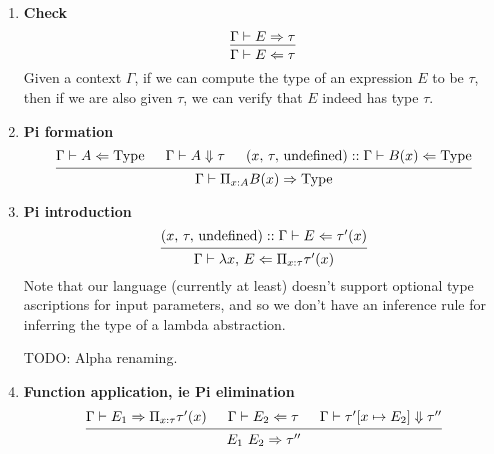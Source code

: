\documentclass{article}
\begin{document}
\begin{definition} 
\begin{enumerate}
  \item \textbf{Check} \\
    \[
      \begin{prooftree}
        \hypo{\Gamma \vdash E \Rightarrow \tau}
        \infer1{\Gamma \vdash E \Leftarrow \tau}
      \end{prooftree}
    \]
    Given a context $\Gamma$, if we can compute the type of an expression $E$ to
    be $\tau$, then if we are also given $\tau$, we can verify that $E$
    indeed has type $\tau$.

  \item \textbf{Pi formation} \\
    \[
      \begin{prooftree}
        \hypo{\Gamma \vdash A \Leftarrow \Type}
        \hypo{\Gamma \vdash A \Downarrow \tau}
        \hypo{(x, \, \tau, \, \text{undefined}) :: \Gamma \vdash B(x) \Leftarrow \Type}
        \infer3{\Gamma \vdash \Pi_{x : A}B(x) \Rightarrow \Type}
      \end{prooftree}
    \]

  \item \textbf{Pi introduction} \\
    \[
      \begin{prooftree}
        \hypo{(x, \, \tau, \, \text{undefined}) :: \Gamma \vdash E \Leftarrow \tau'(x)}
        \infer1{\Gamma \vdash \lambda x, \, E \Leftarrow \Pi_{x : \tau}\tau'(x)}
      \end{prooftree}
    \]
    Note that our language (currently at least) doesn't support optional type
    ascriptions for input parameters, and so we don't have an inference rule
    for inferring the type of a lambda abstraction. 

    TODO: Alpha renaming.

  \item \textbf{Function application, ie Pi elimination} \\
    \[
      \begin{prooftree}
        \hypo{\Gamma \vdash E_1 \Rightarrow \Pi_{x : \tau}\tau'(x)}
        \hypo{\Gamma \vdash E_2 \Leftarrow \tau}
        \hypo{\Gamma \vdash \tau'[x \mapsto E_2] \Downarrow \tau''}
        \infer3{E_1 \,\, E_2 \Rightarrow \tau''}
      \end{prooftree}
    \]


\end{enumerate}
\end{definition}
\end{document}
